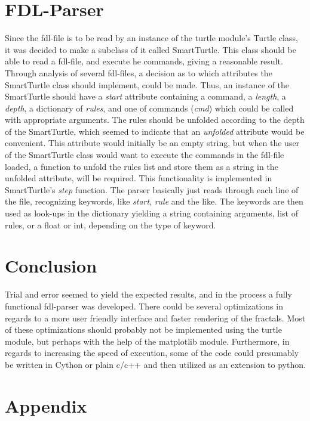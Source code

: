 \documentclass[titlepage]{article}
\begin{document}
\section{FDL-Parser}
Since the fdl-file is to be read by an instance of the turtle module's Turtle class, it was decided to make a subclass of it called SmartTurtle. This class should be able to read a fdl-file, and execute he commands, giving a reasonable result. Through analysis of several fdl-files, a decision as to which attributes the SmartTurtle class should implement, could be made. Thus, an instance of the SmartTurtle should have a \textit{start} attribute containing a command, a \textit{length}, a \textit{depth}, a dictionary of \textit{rules}, and one of commands (\textit{cmd}) which could be called with appropriate arguments. The rules should be unfolded according to the depth of the SmartTurtle, which seemed to indicate that an \textit{unfolded} attribute would be convenient. This attribute would initially be an empty string, but when the user of the SmartTurtle class would want to execute the commands in the fdl-file loaded, a function to unfold the rules list and store them as a string in the unfolded attribute, will be required. This functionality is implemented in SmartTurtle's \textit{step} function. The parser basically just reads through each line of the file, recognizing keywords, like \textit{start}, \textit{rule} and the like. The keywords are then used as look-ups in the dictionary yielding a string containing arguments, list of rules, or a float or int, depending on the type of keyword. 

\section{Conclusion}
Trial and error seemed to yield the expected results, and in the process a fully functional fdl-parser was developed. There could be several optimizations in regards to a more user friendly interface and faster rendering of the fractals. Most of these optimizations should probably not be implemented using the turtle module, but perhaps with the help of the matplotlib module. Furthermore, in regards to increasing the speed of execution, some of the code could presumably be written in Cython or plain c/c++ and then utilized as an extension to python.

\appendix
\section{Appendix}
\end{document}
